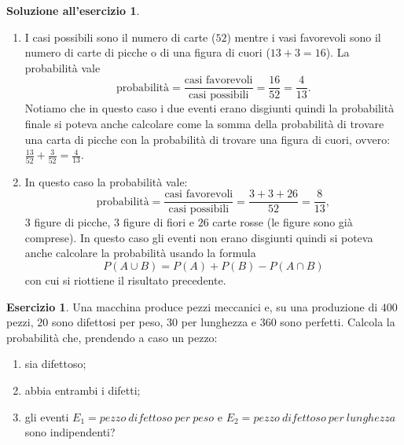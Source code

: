 \documentclass[12pt,a4paper]{article}
\theoremstyle{definition}
\newtheorem{sol}{Soluzione all'esercizio}
\newtheorem{exe}{Esercizio}
\begin{document}
\begin{sol}\mbox{}\vspace{-0.7cm}\\
	\begin{enumerate}
		\item I casi possibili sono il numero di carte ($ 52 $) mentre i vasi favorevoli sono il numero di carte di picche o di una figura di cuori ($ 13 + 3 = 16 $). La probabilità vale
		      \[ \text{probabilità} = \frac{\text{casi favorevoli}}{\text{casi possibili}} = \frac{16}{52} = \frac{4}{13}. \]
		      Notiamo che in questo caso i due eventi erano disgiunti quindi la probabilità finale si poteva anche calcolare come la somma della probabilità di trovare una carta di picche con la probabilità di trovare una figura di cuori, ovvero: $ \frac{13}{52}+\frac{3}{52} = \frac{4}{13}. $
		\item In questo caso la probabilità vale:
		      \[ \text{probabilità} = \frac{\text{casi favorevoli}}{\text{casi possibili}} = \frac{3+3+26}{52} = \frac{8}{13}, \]
		      $ 3 $ figure di picche, $ 3 $ figure di fiori e $ 26 $ carte rosse (le figure sono già comprese). In questo caso gli eventi non erano disgiunti quindi si poteva anche calcolare la probabilità usando la formula
		      \[ P(A \cup B ) = P(A) + P(B) - P(A \cap B)  \]
		      con cui si riottiene il risultato precedente.
	\end{enumerate}
\end{sol}

\begin{exe}
	Una macchina produce pezzi meccanici e, su una produzione di $ 400 $ pezzi, $ 20 $ sono difettosi per peso, $ 30 $ per lunghezza e $ 360 $ sono perfetti. Calcola la probabilità che, prendendo a caso un pezzo:
	\begin{enumerate}
		\item sia difettoso;
		\item abbia entrambi i difetti;
		\item gli eventi $ E_1 = pezzo\ difettoso\ per\ peso $ e $ E_2 = pezzo\ difettoso\ per\ lunghezza $ sono indipendenti?
	\end{enumerate}
\end{exe}
\end{document}
